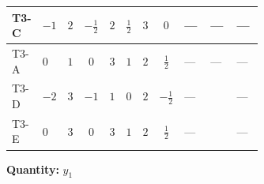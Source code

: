 \documentclass[8pt]{article}
\begin{document}
\begin{landscape}
\begin{longtable}{@{}llcccccc >{\raggedright\arraybackslash}p{0.21\linewidth} >{\raggedright\arraybackslash}p{0.21\linewidth} >{\raggedright\arraybackslash}p{0.21\linewidth}@{}}
\midrule
T3-C & $-1$ & $2$ & $-\frac{1}{2}$ & $2$ & $\frac{1}{2}$ & $3$ & $0$ & --- & --- & --- \\
\midrule
T3-A & $0$ & $1$ & $0$ & $3$ & $1$ & $2$ & $\frac{1}{2}$ & --- & --- & --- \\
\midrule
T3-D & $-2$ & $3$ & $-1$ & $1$ & $0$ & $2$ & $-\frac{1}{2}$ & --- & \scriptsize\adjustbox{max width=\linewidth}{$\begin{gathered} T_{\nu}^{(1)} \left({y_1}\right)_{ij}\end{gathered}$} & --- \\
\midrule
T3-E & $0$ & $3$ & $0$ & $3$ & $1$ & $2$ & $\frac{1}{2}$ & --- & \scriptsize\adjustbox{max width=\linewidth}{$\begin{gathered} T_{\nu}^{(1)} \left({y_1}\right)_{ij}\end{gathered}$} & --- \\
\midrule
\bottomrule
\end{longtable}
\clearpage
\noindent\textbf{Quantity: }$y_1$\par\smallskip

\end{landscape}
\end{document}
